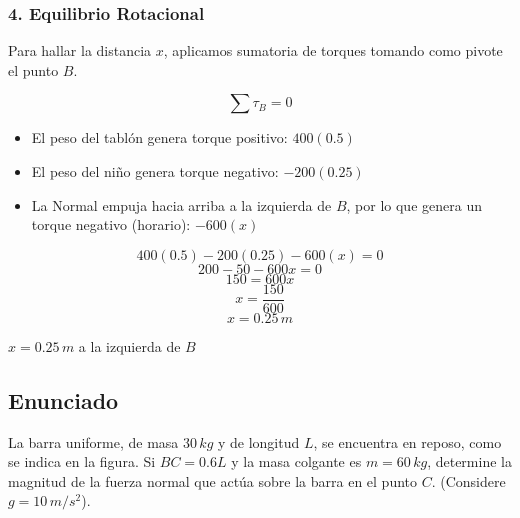 \documentclass[12pt, a4paper]{article}
\begin{document}
\subsubsection*{4. Equilibrio Rotacional}
Para hallar la distancia $x$, aplicamos sumatoria de torques tomando como pivote el punto $B$.

$$\sum \tau_B = 0$$

\begin{itemize}
    \item El peso del tablón genera torque positivo: $400(0.5)$
    \item El peso del niño genera torque negativo: $-200(0.25)$
    \item La Normal empuja hacia arriba a la izquierda de $B$, por lo que genera un torque negativo (horario): $-600(x)$
\end{itemize}

$$400(0.5) - 200(0.25) - 600(x) = 0$$
$$200 - 50 - 600x = 0$$
$$150 = 600x$$
$$x = \frac{150}{600}$$
$$x = 0.25 \, \si{m}$$

\begin{tcolorbox}[colback=green!5!white, colframe=green!50!black, title=Respuesta Final]
\centering \Large $x = 0.25 \, \si{m}$ a la izquierda de $B$
\end{tcolorbox}

\newpage

\subsection*{Enunciado}
La barra uniforme, de masa $30 \, \si{kg}$ y de longitud $L$, se encuentra en reposo, como se indica en la figura. Si $BC = 0.6 L$ y la masa colgante es $m = 60 \, \si{kg}$, determine la magnitud de la fuerza normal que actúa sobre la barra en el punto $C$. (Considere $g = 10 \, \si{m/s^2}$).

\begin{center}
\end{center}
\end{document}
